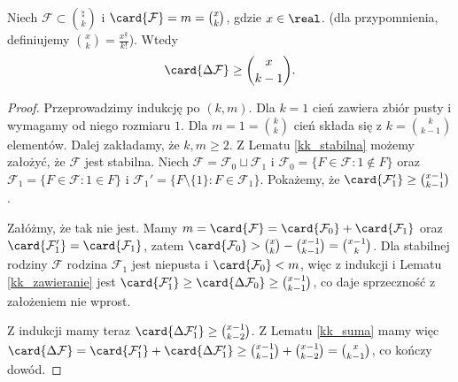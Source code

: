 \begin{theorem}[Lov\'{a}sz]
	Niech $\mathcal F\subset\binom{\natural}{k}$ i $\card{\mathcal F} = m =
		\binom{x}{k}$, gdzie $x\in\real$.
	(dla przypomnienia, definiujemy $\binom{x}{k} = \frac{x^{\underline{k}}}{k!}$).
	Wtedy $$\card{\Delta\mathcal F} \ge \binom{x}{k-1}.$$
\end{theorem}
\begin{proof}
	Przeprowadzimy indukcję po $(k,m)$. Dla $k=1$ cień zawiera zbiór pusty i
	wymagamy od niego rozmiaru $1$. Dla $m=1 = \binom{k}{k}$ cień składa się z $k
		= \binom{k}{k-1}$ elementów. Dalej zakładamy, że $k,m\ge 2$. Z Lematu
	\ref{kk_stabilna} możemy założyć, że $\mathcal F$ jest stabilna. Niech
	$\mathcal F = \mathcal F_0 \sqcup \mathcal F_1$ i $\mathcal F_0 = \{F \in
		\mathcal F : 1 \notin F\}$ oraz $\mathcal F_1 = \{F \in \mathcal F : 1 \in
		F\}$ i $\mathcal F_1' = \{F \setminus \{1\} : F \in \mathcal F_1\}$.
	Pokażemy, że $\card{\mathcal F'_1} \ge \binom{x-1}{k-1}$.

	Załóżmy, że tak nie jest. Mamy $m=\card{\mathcal F} = \card{\mathcal F_0} +
		\card{\mathcal F_1}$ oraz $\card{\mathcal F'_1} = \card{\mathcal F_1}$, zatem
	$\card{\mathcal F_0} > \binom{x}{k} - \binom{x-1}{k-1} = \binom{x-1}{k}$. Dla
	stabilnej rodziny $\mathcal F$ rodzina $\mathcal F_1$ jest niepusta i
	$\card{\mathcal F_0} < m$, więc z indukcji i Lematu \ref{kk_zawieranie} jest
	$\card{\mathcal F'_1} \ge \card{\Delta\mathcal F_0} \ge \binom{x-1}{k-1}$, co
	daje sprzeczność z założeniem nie wprost.

	Z indukcji mamy teraz $\card{\Delta\mathcal F'_1} \ge \binom{x-1}{k-2}$. Z
	Lematu \ref{kk_suma} mamy więc $\card{\Delta\mathcal F} = \card{\mathcal
			F'_1} + \card{\Delta\mathcal F'_1} \ge \binom{x-1}{k-1} + \binom{x-1}{k-2} =
		\binom{x}{k-1}$, co kończy dowód.
\end{proof}



